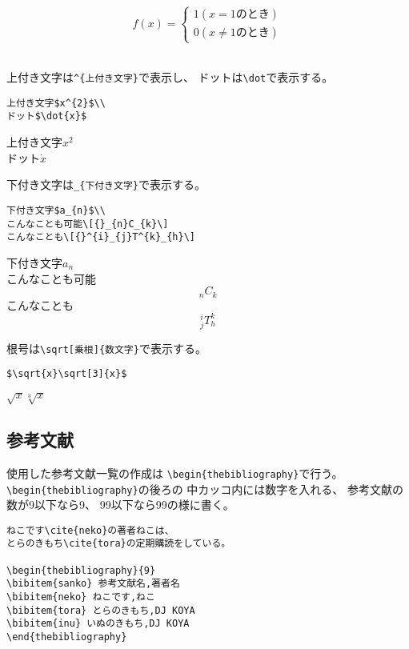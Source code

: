 \documentclass{jsarticle}
\begin{document}
\begin{equation}
		f(x)= \left\{
				\begin{array}{}
						1 (x=1のとき)\\
						0 (x≠1のとき)
				\end{array}
				\right.
\end{equation}\\
\par

上付き文字は\verb|^{上付き文字}|で表示し、
ドットは\verb|\dot|で表示する。

\begin{verbatim}
上付き文字$x^{2}$\\
ドット$\dot{x}$
\end{verbatim}

\noindent
上付き文字$x^{2}$\\
ドット$\dot{x}$\\
\par

下付き文字は\verb|_{下付き文字}|で表示する。

\begin{verbatim}
下付き文字$a_{n}$\\
こんなことも可能\[{}_{n}C_{k}\]
こんなことも\[{}^{i}_{j}T^{k}_{h}\]
\end{verbatim}

\noindent
下付き文字$a_{n}$\\
こんなことも可能\[{}_{n}C_{k}\]
こんなことも\[{}^{i}_{j}T^{k}_{h}\]
\par

根号は\verb|\sqrt[乗根]{数文字}|で表示する。

\begin{verbatim}
$\sqrt{x}\sqrt[3]{x}$
\end{verbatim}

\noindent
$\sqrt{x}\sqrt[3]{x}$\\
\par

\subsection{参考文献}
使用した参考文献一覧の作成は
\verb|\begin{thebibliography}|で行う。
\verb|\begin{thebibliography}|の後ろの
中カッコ内には数字を入れる、
参考文献の数が9以下なら9、
99以下なら99の様に書く。

\begin{verbatim}
ねこです\cite{neko}の著者ねこは、
とらのきもち\cite{tora}の定期購読をしている。

\begin{thebibliography}{9}
\bibitem{sanko} 参考文献名,著者名
\bibitem{neko} ねこです,ねこ
\bibitem{tora} とらのきもち,DJ KOYA
\bibitem{inu} いぬのきもち,DJ KOYA
\end{thebibliography}
\end{verbatim}
\end{document}
